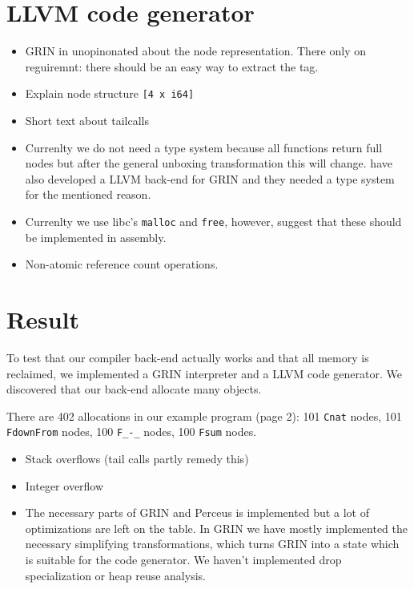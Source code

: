 \documentclass[10pt, twocolumn]{article}
\begin{document}
\section{LLVM code generator}
\begin{itemize}
\item GRIN in unopinonated about the node representation. There only on reguiremnt: there should be 
      an easy way to extract the tag.
\item Explain node structure \texttt{[4 x i64]}
\item Short text about tailcalls
\item Currenlty we do not need a type system because all functions 
      return full nodes but after the general unboxing transformation 
      this will change. \citet{podlovics2021} have also developed a 
      LLVM back-end for GRIN and they needed a type system for the mentioned 
      reason.
\item Currenlty we use libc's \texttt{malloc} and \texttt{free}, however, \citeauthor{pinto2023} suggest that these should be implemented in assembly.
\item Non-atomic reference count operations.
\end{itemize}

\section{Result}

To test that our compiler back-end actually works and that all memory is reclaimed, we implemented a GRIN interpreter and a LLVM code generator.
We discovered that our back-end allocate many objects. 

There are 402 allocations in our example program (page 2): 
101 \texttt{Cnat} nodes, 101 \texttt{FdownFrom} nodes, 100 \texttt{F\_-\_} nodes, 100 \texttt{Fsum} nodes.

\begin{itemize}
\item Stack overflows (tail calls partly remedy this)
\item Integer overflow
\item The necessary parts of GRIN and Perceus is implemented but a lot of optimizations are 
      left on the table. In GRIN we have mostly implemented the necessary simplifying transformations,
      which turns GRIN into a state which is suitable for the code generator.
      We haven't implemented drop specialization or heap reuse analysis.
\end{itemize}
\end{document}
